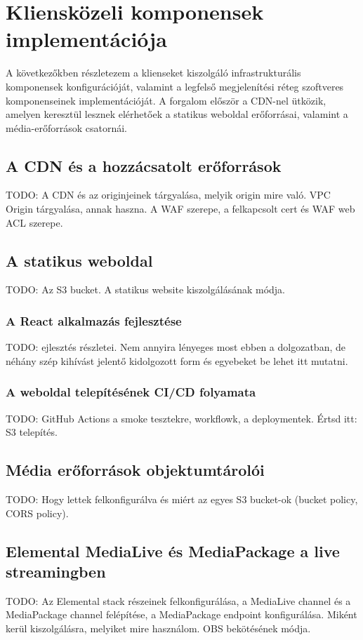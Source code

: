 \chapter{Kliensközeli komponensek implementációja}

A következőkben részletezem a klienseket kiszolgáló infrastrukturális komponensek konfigurációját, valamint a legfelső megjelenítési réteg szoftveres komponenseinek implementációját. A forgalom először a CDN-nel ütközik, amelyen keresztül lesznek elérhetőek a statikus weboldal erőforrásai, valamint a média-erőforrások csatornái.

\section{A CDN és a hozzácsatolt erőforrások}

TODO: A CDN és az originjeinek tárgyalása, melyik origin mire való. VPC Origin tárgyalása, annak haszna. A WAF szerepe, a felkapcsolt cert és WAF web ACL szerepe.

\section{A statikus weboldal}

TODO: Az S3 bucket. A statikus website kiszolgálásának módja.

\subsection{A React alkalmazás fejlesztése}

TODO: ejlesztés részletei. Nem annyira lényeges most ebben a dolgozatban, de néhány szép kihívást jelentő kidolgozott form és egyebeket be lehet itt mutatni.

\subsection{A weboldal telepítésének CI/CD folyamata}

TODO: GitHub Actions a smoke tesztekre, workflowk, a deploymentek. Értsd itt: S3 telepítés.

\section{Média erőforrások objektumtárolói}

TODO: Hogy lettek felkonfigurálva és miért az egyes S3 bucket-ok (bucket policy, CORS policy).

\section{Elemental MediaLive és MediaPackage a live streamingben}

TODO: Az Elemental stack részeinek felkonfigurálása, a MediaLive channel és a MediaPackage channel felépítése, a MediaPackage endpoint konfigurálása. Miként kerül kiszolgálásra, melyiket mire használom. OBS bekötésének módja.
